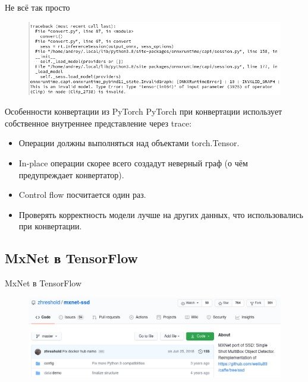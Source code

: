 \documentclass[mathserif,serif,unicode]{beamer}
\begin{document}
\begin{frame}{Не всё так просто}
\begin{block}{}
\begin{figure}
    \centering
    \includegraphics[width=\textwidth]{images/conv_error.png}
\end{figure}
\end{block}
\end{frame}

\begin{frame}{Особенности конвертации из PyTorch}
PyTorch при конвертации использует собственное внутреннее представление через trace:
    \begin{itemize}
        \item Операции должны выполняться над объектами torch.Tensor.
        \item In-place операции скорее всего создадут неверный граф (о чём предупреждает конвертатор).
        \item Control flow посчитается один раз.
        \item Проверять корректность модели лучше на других данных, что использовались при конвертации.
    \end{itemize}
\end{frame}

\subsection{MxNet в TensorFlow}

\begin{frame}{MxNet в TensorFlow}

\begin{block}{}
    \begin{figure}
        \centering
        \includegraphics[width=\textwidth]{images/mxnet_ssd.png}
    \end{figure}
\end{block}
    
\end{frame}
\end{document}
